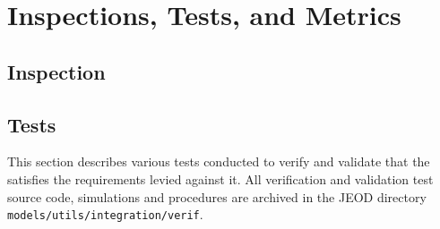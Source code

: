 \chapter{Inspections, Tests, and Metrics}\label{ch:ivv}

\section{Inspection}\label{sec:inspect}



\section{Tests}
This section describes various tests conducted to verify and validate 
that the \ModelDesc satisfies the requirements levied against it.  
All verification and validation test source code, simulations and procedures 
are archived in the JEOD directory 
{\tt models/utils/integration/verif}.\relax



\newpage
\boilerplatetraceability

\newpage
\boilerplatemetrics


